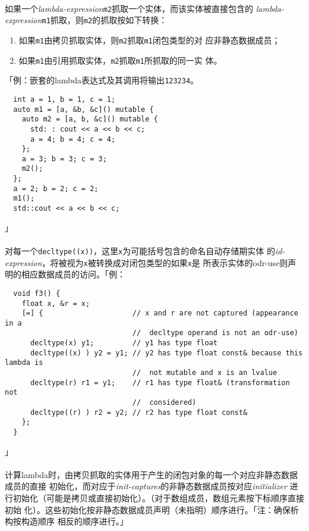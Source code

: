 \paragraph{}
如果一个\textit{lambda-expression}\texttt{m2}抓取一个实体，而该实体被直接包含的
\textit{lambda-expression}\texttt{m1}抓取，则\texttt{m2}的抓取按如下转换：
\begin{enumerate}
  \item{如果\texttt{m1}由拷贝抓取实体，则\texttt{m2}抓取\texttt{m1}闭包类型的对
    应非静态数据成员；}
  \item{如果\texttt{m1}由引用抓取实体，\texttt{m2}抓取\texttt{m1}所抓取的同一实
    体。}
\end{enumerate}
「例：嵌套的lambda表达式及其调用将输出\texttt{123234}。
\begin{lstlisting}
  int a = 1, b = 1, c = 1;
  auto m1 = [a, &b, &c]() mutable {
    auto m2 = [a, b, &c]() mutable {
      std: : cout << a << b << c;
      a = 4; b = 4; c = 4;
    };
    a = 3; b = 3; c = 3;
    m2();
  };
  a = 2; b = 2; c = 2;
  m1();
  std::cout << a << b << c;
\end{lstlisting}」

\paragraph{}
对每一个\texttt{decltype((x))}，这里\texttt{x}为可能括号包含的命名自动存储期实体
的\textit{id-expression}，将被视为\texttt{x}被转换成对闭包类型的如果\texttt{x}是
所表示实体的odr-use则声明的相应数据成员的访问。「例：
\begin{lstlisting}
  void f3() {
    float x, &r = x;
    [=] {                     // x and r are not captured (appearance in a
                              //  decltype operand is not an odr-use)
      decltype(x) y1;         // y1 has type float
      decltype((x) ) y2 = y1; // y2 has type float const& because this lambda is
                              //  not mutable and x is an lvalue
      decltype(r) r1 = y1;    // r1 has type float& (transformation not
                              //  considered)
      decltype((r) ) r2 = y2; // r2 has type float const&
    };
  }
\end{lstlisting}」

\paragraph{}
计算lambda时，由拷贝抓取的实体用于产生的闭包对象的每一个对应非静态数据成员的直接
初始化，而对应于\textit{init-captures}的非静态数据成员按对应\textit{initializer}
进行初始化（可能是拷贝或直接初始化）。（对于数组成员，数组元素按下标顺序直接初始
化）。这些初始化按非静态数据成员声明（未指明）顺序进行。「注：确保析构按构造顺序
相反的顺序进行。」


